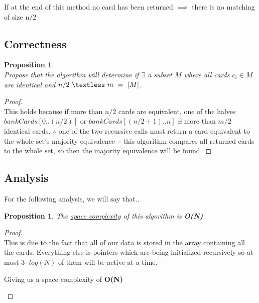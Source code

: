 \documentclass[12pt]{article}
\newtheorem{proposition}[theorem]{Proposition}
\begin{document}
If at the end of this method no card has been returned $\implies$
there is no matching of size n/2




\subsection{Correctness}
\begin{proposition}
~ \\ \indent Propose that the algorithm will determine if $\exists$
a subset $M$ where all cards $c_i \in M$ are identical and
$n/2\ \textless\ m\ =\ |M|$.

\end{proposition}

\begin{proof}
~ \\ \indent This holds because if more than $n/2$ cards are equivalent,
one of the halves $bankCards[0..(n/2)]$ or $bankCards[(n/2+1)..n]$
$\exists$ more than $m/2$ identical cards. $\therefore$ one of the two
recursive calls must return a card equivalent to the whole set’s
majority equivalence $\therefore$ this algorithm compares all returned
cards to the whole set, so then the majority equivalence will be found.
\end{proof}


\subsection{Analysis}
For the following analysis, we will say that..

\begin{proposition}
\label{numq}
The \underline{space complexity} of this algorithm is \textbf{O(N)}
\end{proposition}

\begin{proof}
~ \\ \indent This is due to the fact that all of our data is stored
in the array containing all the cards. Everything else is pointers
which are being initialized recursively so at most $3\cdot log(N)$
of them will be active at a time.
\begin{center}
    Giving us a space complexity of \textbf{O(N)}
\end{center}
\end{proof}
\end{document}

